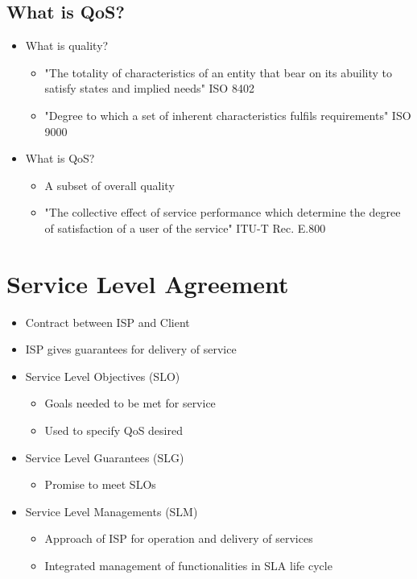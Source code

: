 \subsection{What is QoS?}
\begin{itemize}
	\item What is quality?
	\begin{itemize}
		\item "The totality of characteristics of an entity that bear on
			its abuility to satisfy states and implied needs" ISO
			8402
		\item "Degree to which a set of inherent characteristics fulfils
			requirements" ISO 9000
	\end{itemize}
	\item What is QoS?
	\begin{itemize}
		\item A subset of overall quality
		\item "The collective effect of service performance which
			determine the degree of satisfaction of a user of the
			service" ITU-T Rec. E.800
	\end{itemize}
\end{itemize}

\section{Service Level Agreement}
\begin{itemize}
	\item Contract between ISP and Client
	\item ISP gives guarantees for delivery of service
	\item Service Level Objectives (SLO)
	\begin{itemize}
		\item Goals needed to be met for service
		\item Used to specify QoS desired
	\end{itemize}
	\item Service Level Guarantees (SLG)
	\begin{itemize}
		\item Promise to meet SLOs
	\end{itemize}
	\item Service Level Managements (SLM)
	\begin{itemize}
		\item Approach of ISP for operation and delivery of services
		\item Integrated management of functionalities in SLA life cycle
	\end{itemize}
\end{itemize}
